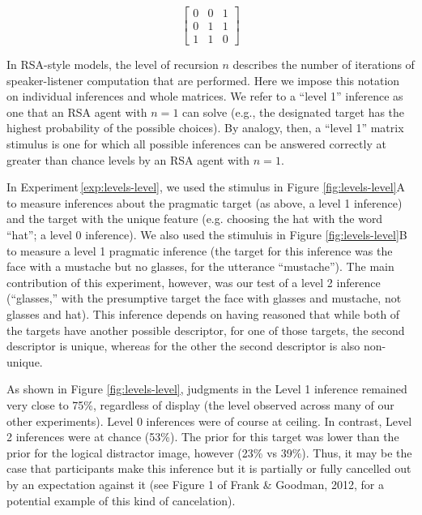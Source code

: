 \documentclass[man,noapacite]{apa2}
\newcounter{Experiment}
\newcommand{\exptref}[1]{Experiment\,\ref{#1}}
\begin{document}
\begin{equation}
\left[
    \begin{array}{ccc}
      0 & 0 & 1 \\
      0 & 1 & 1\\
      1 & 1 & 0
    \end{array}
  \right]
\end{equation}

\noindent In RSA-style models, the level of recursion $n$ describes the number of iterations of speaker-listener computation that are performed. Here we impose this notation on individual inferences and whole matrices. We refer to a ``level 1'' inference as one that an RSA agent with $n=1$ can solve (e.g., the designated target has the highest probability of the possible choices). By analogy, then, a ``level 1'' matrix stimulus is one for which all possible inferences can be answered correctly at greater than chance levels by an RSA agent with $n=1$.

In \exptref{exp:levels-level}, we used the stimulus in Figure \ref{fig:levels-level}A to measure inferences about the pragmatic target (as above, a level 1 inference) and the target with the unique feature (e.g. choosing the hat with the word ``hat''; a level 0 inference). We also used the stimuluis in Figure \ref{fig:levels-level}B to measure a level 1 pragmatic inference (the target for this inference was the face with a mustache but no glasses, for the utterance ``mustache''). The main contribution of this experiment, however, was our test of a level 2 inference (``glasses,'' with the presumptive target the face with glasses and mustache, not glasses and hat). This inference depends on having reasoned that while both of the targets have another possible descriptor, for one of those targets, the second descriptor is unique, whereas for the other the second descriptor is also non-unique.

As shown in Figure \ref{fig:levels-level}, judgments in the Level 1 inference remained very close to 75\%, regardless of display (the level observed across many of our other experiments). Level 0 inferences were of course at ceiling. In contrast, Level 2 inferences were at chance (53\%). The prior for this target was lower than the prior for the logical distractor image, however (23\% vs 39\%). Thus, it may be the case that participants make this inference but it is partially or fully cancelled out by an expectation against it (see Figure 1 of Frank \& Goodman, 2012, for a potential example of this kind of cancelation).
\end{document}

